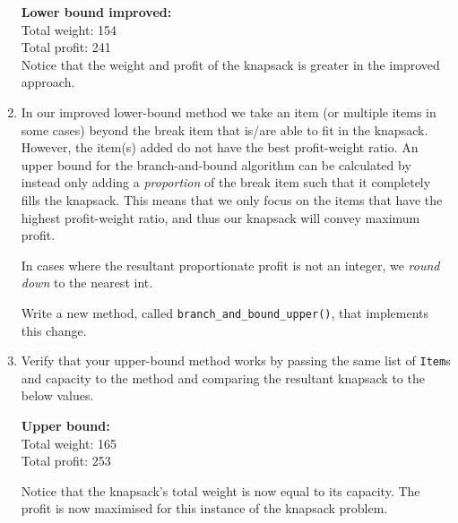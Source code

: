 \documentclass[11pt,a4paper]{report}
\begin{document}
\begin{enumerate}
    \textbf{Lower bound improved:}\\
    Total weight: 154\\
    Total profit: 241\\

    Notice that the weight and profit of the knapsack is greater in the improved approach.
    
    \item In our improved lower-bound method we take an item (or multiple items in some cases) beyond the break item that is/are able to fit in the knapsack. However, the item(s) added do not have the best profit-weight ratio. An upper bound for the branch-and-bound algorithm can be calculated by instead only adding a \textit{proportion} of the break item such that it completely fills the knapsack. This means that we only focus on the items that have the highest profit-weight ratio, and thus our knapsack will convey maximum profit.

    In cases where the resultant proportionate profit is not an integer, we \textit{round down} to the nearest int.

    Write a new method, called \texttt{branch\_and\_bound\_upper()}, that implements this change.
    
    \item Verify that your upper-bound method works by passing the same list of \texttt{Item}s and capacity to the method and comparing the resultant knapsack to the below values.

    \textbf{Upper bound:}\\
    Total weight: 165\\
    Total profit: 253

    Notice that the knapsack's total weight is now equal to its capacity. The profit is now maximised for this instance of the knapsack problem.

\end{enumerate}
\end{document}
